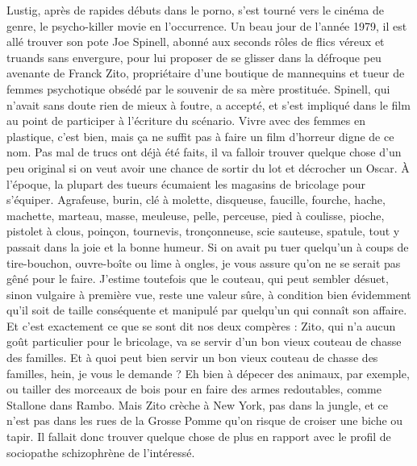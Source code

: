 Lustig, après de rapides débuts dans le porno, s’est tourné vers le cinéma de genre, le psycho-killer movie en l’occurrence. Un beau jour de l’année 1979, il est allé trouver son pote Joe Spinell, abonné aux seconds rôles de flics véreux et truands sans envergure, pour lui proposer de se glisser dans la défroque peu avenante de Franck Zito, propriétaire d’une boutique de mannequins et tueur de femmes psychotique obsédé par le souvenir de sa mère prostituée. Spinell, qui n’avait sans doute rien de mieux à foutre, a accepté, et s’est impliqué dans le film au point de participer à l’écriture du scénario. Vivre avec des femmes en plastique, c’est bien, mais ça ne suffit pas à faire un film d’horreur digne de ce nom. Pas mal de trucs ont déjà été faits, il va falloir trouver quelque chose d’un peu original si on veut avoir une chance de sortir du lot et décrocher un Oscar. À l’époque, la plupart des tueurs écumaient les magasins de bricolage pour s’équiper. Agrafeuse, burin, clé à molette, disqueuse, faucille, fourche, hache, machette, marteau, masse, meuleuse, pelle, perceuse, pied à coulisse, pioche, pistolet à clous, poinçon, tournevis, tronçonneuse, scie sauteuse, spatule, tout y passait dans la joie et la bonne humeur. Si on avait pu tuer quelqu’un à coups de tire-bouchon, ouvre-boîte ou lime à ongles, je vous assure qu’on ne se serait pas gêné pour le faire. J’estime toutefois que le couteau, qui peut sembler désuet, sinon vulgaire à première vue, reste une valeur sûre, à condition bien évidemment qu’il soit de taille conséquente et manipulé par quelqu’un qui connaît son affaire. Et c’est exactement ce que se sont dit nos deux compères : Zito, qui n’a aucun goût particulier pour le bricolage, va se servir d’un bon vieux couteau de chasse des familles. Et à quoi peut bien servir un bon vieux couteau de chasse des familles, hein, je vous le demande ? Eh bien à dépecer des animaux, par exemple, ou tailler des morceaux de bois pour en faire des armes redoutables, comme Stallone dans Rambo. Mais Zito crèche à New York, pas dans la jungle, et ce n’est pas dans les rues de la Grosse Pomme qu’on risque de croiser une biche ou tapir. Il fallait donc trouver quelque chose de plus en rapport avec le profil de sociopathe schizophrène de l’intéressé.

